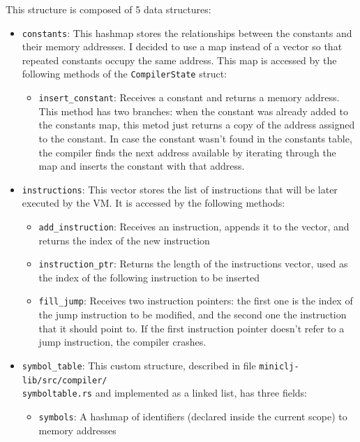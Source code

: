 \documentclass[11pt]{scrreprt}
\begin{document}
\inputminted[firstline=13,lastline=21]{rust}{/home/mario/git/MarioJim/miniclj/miniclj-lib/src/compiler/state.rs}

This structure is composed of 5 data structures:
\begin{itemize}
  \item \texttt{constants}: This hashmap stores the relationships between the constants and their memory addresses. I decided to use a map instead of a vector so that repeated constants occupy the same address. This map is accessed by the following methods of the \texttt{CompilerState} struct:
  \begin{itemize}
    \item \texttt{insert\_constant}: Receives a constant and returns a memory address. This method has two branches: when the constant was already added to the constants map, this metod just returns a copy of the address assigned to the constant. In case the constant wasn't found in the constants table, the compiler finds the next address available by iterating through the map and inserts the constant with that address.
  \end{itemize}
  \item \texttt{instructions}: This vector stores the list of instructions that will be later executed by the VM. It is accessed by the following methods:
  \begin{itemize}
    \item \texttt{add\_instruction}: Receives an instruction, appends it to the vector, and returns the index of the new instruction
    \item \texttt{instruction\_ptr}: Returns the length of the instructions vector, used as the index of the following instruction to be inserted
    \item \texttt{fill\_jump}: Receives two instruction pointers: the first one is the index of the jump instruction to be modified, and the second one the instruction that it should point to. If the first instruction pointer doesn't refer to a jump instruction, the compiler crashes.
  \end{itemize}
  \item \texttt{symbol\_table}: This custom structure, described in file \texttt{miniclj-lib/src/compiler/\\symboltable.rs} and implemented as a linked list, has three fields:
  \begin{itemize}
    \item \texttt{symbols}: A hashmap of identifiers (declared inside the current scope) to memory addresses

\end{itemize}
\end{itemize}
\end{document}
